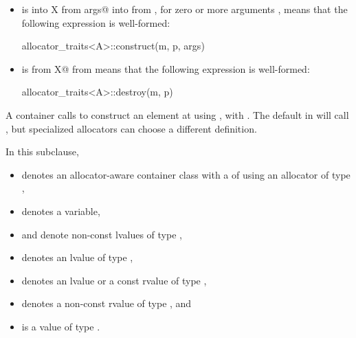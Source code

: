 \begin{itemize}
\item
{} is
{ into X from args@ into  from },
for zero
or more arguments , means that the following expression is well-formed:
\begin{codeblock}
allocator_traits<A>::construct(m, p, args)
\end{codeblock}

\item
{} is
{ from X@ from }
means that the following expression is well-formed:
\begin{codeblock}
allocator_traits<A>::destroy(m, p)
\end{codeblock}
\end{itemize}

\begin{note}
A container calls 
to construct an element at  using ,
with .
The default  in  will
call ,
but specialized allocators can choose a different definition.
\end{note}

\pnum
In this subclause,
\begin{itemize}
\item
{} denotes an allocator-aware container class
with a  of  using an allocator of type ,
\item
{} denotes a variable,
\item
{} and  denote non-const lvalues of type ,
\item
{} denotes an lvalue of type ,
\item
{} denotes an lvalue or a const rvalue of type ,
\item
{} denotes a non-const rvalue of type , and
\item
{} is a value of type .
\end{itemize}

\renewcommand{\indexcont}[1]{%
\indexlibrarymisc{\idxcode{#1}}{allocator-aware containers}%
\indexlibrarymemberx{deque}{#1}%
\indexlibrarymemberx{forward_list}{#1}%
\indexlibrarymemberx{list}{#1}%
\indexlibrarymemberx{vector}{#1}%
\indexlibrarymemberx{map}{#1}%
\indexlibrarymemberx{set}{#1}%
\indexlibrarymemberx{multiset}{#1}%
\indexlibrarymemberx{multimap}{#1}%
\indexlibrarymemberx{unordered_map}{#1}%
\indexlibrarymemberx{unordered_set}{#1}%
\indexlibrarymemberx{unordered_multiset}{#1}%
\indexlibrarymemberx{unordered_multimap}{#1}%
}

